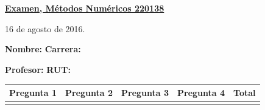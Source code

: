 \documentclass[11pt]{article}
\begin{document}
\hspace*{-1,5cm}

\vspace*{0.5cm} \centerline {\bf\underline{Examen, M\'etodos Num\'ericos 220138 }}
\centerline{\textrm{16 de agosto de 2016.}}  \vspace{0.2cm}


\textbf{Nombre:} \hspace{0.5\textwidth}\textbf{Carrera:}

\vspace{0.1cm}
\textbf{Profesor:}\hspace{0.5\textwidth} \textbf{ RUT:}

\begin{center}
 \begin{tabular}{||p{2cm}|p{2cm}|p{2cm}|p{2cm}||p{2cm}||}
 \hline
 Pregunta 1 &  Pregunta 2 &     Pregunta 3  & Pregunta 4 &Total\\
 \hline

  \vspace{1.5cm} & & & & \\
 \hline
 \end{tabular}
 \end{center}
\end{document}
